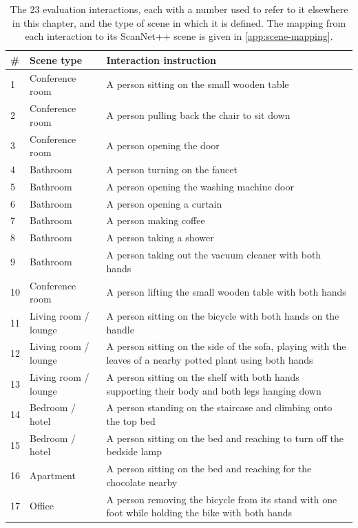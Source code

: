 \begin{table}[!htbp]
  \centering
  \caption[Evaluation interactions.]{The 23 evaluation interactions, each with a number used to refer to it elsewhere in this chapter, and the type of scene in which it is defined. The mapping from each interaction to its ScanNet++ scene is given in \cref{app:scene-mapping}.}
  \label{tab:exp-interactions}
  \small
  \begin{tabularx}{\textwidth}{@{}llX@{}}
    \toprule
    \# & Scene type & Interaction instruction \\
    \midrule
    1  & Conference room & A person sitting on the small wooden table \\
    2  & Conference room & A person pulling back the chair to sit down \\
    3  & Conference room & A person opening the door \\
    4  & Bathroom & A person turning on the faucet \\
    5  & Bathroom & A person opening the washing machine door \\
    6  & Bathroom & A person opening a curtain \\
    7  & Bathroom & A person making coffee \\
    8  & Bathroom & A person taking a shower \\
    9  & Bathroom & A person taking out the vacuum cleaner with both hands \\
    10 & Conference room & A person lifting the small wooden table with both hands \\
    11 & Living room / lounge & A person sitting on the bicycle with both hands on the handle \\
    12 & Living room / lounge & A person sitting on the side of the sofa, playing with the leaves of a nearby potted plant using both hands \\
    13 & Living room / lounge & A person sitting on the shelf with both hands supporting their body and both legs hanging down \\
    14 & Bedroom / hotel & A person standing on the staircase and climbing onto the top bed \\
    15 & Bedroom / hotel & A person sitting on the bed and reaching to turn off the bedside lamp \\
    16 & Apartment & A person sitting on the bed and reaching for the chocolate nearby \\
    17 & Office & A person removing the bicycle from its stand with one foot while holding the bike with both hands \\

\end{tabularx}
\end{table}
